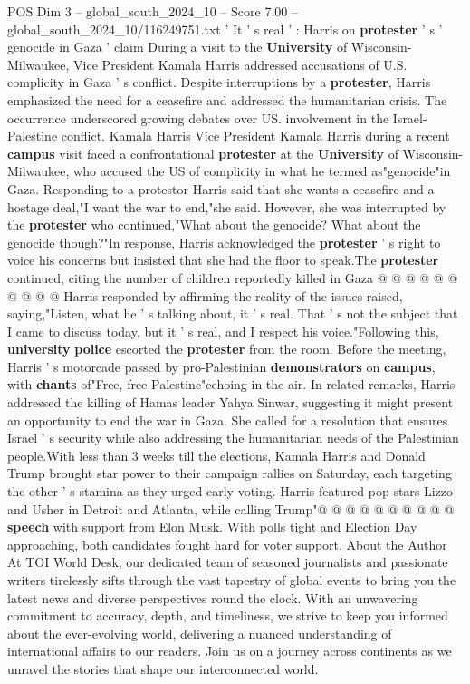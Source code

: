 \begin{textsample}{POS Dim 3 – global\_south\_2024\_10 – Score 7.00 – global\_south\_2024\_10/116249751.txt}  \label{ex:f3_pos_407}
' It ' s real ' : Harris on \textbf{protester} ' s ' genocide in Gaza ' claim During a visit to the \textbf{University} of Wisconsin-Milwaukee, Vice President Kamala Harris addressed accusations of U.S. complicity in Gaza ' s conflict.
Despite interruptions by a \textbf{protester}, Harris emphasized the need for a ceasefire and addressed the humanitarian crisis.
The occurrence underscored growing debates over US. involvement in the Israel-Palestine conflict.
Kamala Harris Vice President Kamala Harris during a recent \textbf{campus} visit faced a confrontational \textbf{protester} at the \textbf{University} of Wisconsin-Milwaukee, who accused the US of complicity in what he termed as"genocide"in Gaza.
Responding to a protestor Harris said that she wants a ceasefire and a hostage deal,"I want the war to end,"she said.
However, she was interrupted by the \textbf{protester} who continued,"What about the genocide?
What about the genocide though?"In response, Harris acknowledged the \textbf{protester} ' s right to voice his concerns but insisted that she had the floor to speak.The \textbf{protester} continued, citing the number of children reportedly killed in Gaza @ @ @ @ @ @ @ @ @ @ Harris responded by affirming the reality of the issues raised, saying,"Listen, what he ' s talking about, it ' s real.
That ' s not the subject that I came to discuss today, but it ' s real, and I respect his voice."Following this, \textbf{university} \textbf{police} escorted the \textbf{protester} from the room.
Before the meeting, Harris ' s motorcade passed by pro-Palestinian \textbf{demonstrators} on \textbf{campus}, with \textbf{chants} of"Free, free Palestine"echoing in the air.
In related remarks, Harris addressed the killing of Hamas leader Yahya Sinwar, suggesting it might present an opportunity to end the war in Gaza.
She called for a resolution that ensures Israel ' s security while also addressing the humanitarian needs of the Palestinian people.With less than 3 weeks till the elections, Kamala Harris and Donald Trump brought star power to their campaign rallies on Saturday, each targeting the other ' s stamina as they urged early voting.
Harris featured pop stars Lizzo and Usher in Detroit and Atlanta, while calling Trump"@ @ @ @ @ @ @ @ @ @ \textbf{speech} with support from Elon Musk.
With polls tight and Election Day approaching, both candidates fought hard for voter support.
About the Author At TOI World Desk, our dedicated team of seasoned journalists and passionate writers tirelessly sifts through the vast tapestry of global events to bring you the latest news and diverse perspectives round the clock.
With an unwavering commitment to accuracy, depth, and timeliness, we strive to keep you informed about the ever-evolving world, delivering a nuanced understanding of international affairs to our readers.
Join us on a journey across continents as we unravel the stories that shape our interconnected world.

\end{textsample}

